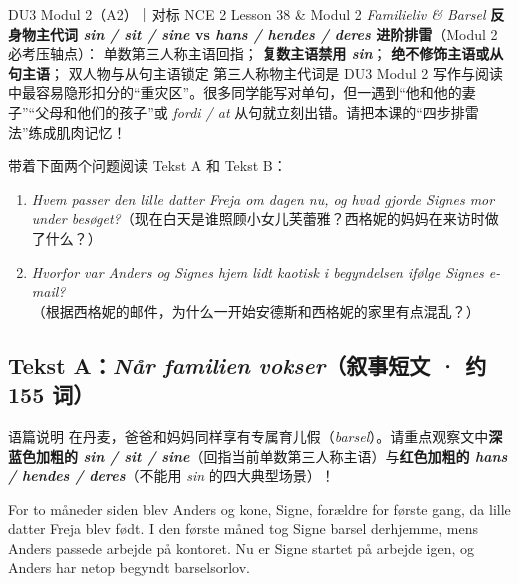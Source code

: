 {DU3 Modul 2（A2）｜对标 NCE 2 Lesson 38 \& Modul 2 \textit{Familieliv \& Barsel}}
{\textbf{反身物主代词 \textit{sin / sit / sine} vs \textit{hans / hendes / deres} 进阶排雷}（Modul 2 必考压轴点）： 单数第三人称主语回指； \textbf{复数主语禁用 \textit{sin}}； \textbf{绝不修饰主语或从句主语}； 双人物与从句主语锁定}
{第三人称物主代词是 DU3 Modul 2 写作与阅读中最容易隐形扣分的“重灾区”。很多同学能写对单句，但一遇到“他和他的妻子”“父母和他们的孩子”或 \textit{fordi / at} 从句就立刻出错。请把本课的“四步排雷法”练成肌肉记忆！}

\begin{foerduleaeser}
带着下面两个问题阅读 Tekst A 和 Tekst B：
\begin{enumerate}
  \item \textit{Hvem passer den lille datter Freja om dagen nu, og hvad gjorde Signes mor under besøget?}（现在白天是谁照顾小女儿芙蕾雅？西格妮的妈妈在来访时做了什么？）
  \item \textit{Hvorfor var Anders og Signes hjem lidt kaotisk i begyndelsen ifølge Signes e-mail?}（根据西格妮的邮件，为什么一开始安德斯和西格妮的家里有点混乱？）
\end{enumerate}
\end{foerduleaeser}


\subsection*{Tekst A：\textit{Når familien vokser}（叙事短文 · 约 155 词）}

\begin{tipbox}{语篇说明}
在丹麦，爸爸和妈妈同样享有专属育儿假（\textit{barsel}）。请重点观察文中\textbf{\color{NCDNavy}深蓝色加粗的 \textit{sin / sit / sine}}（回指当前单数第三人称主语）与\textbf{\color{NCDRed}红色加粗的 \textit{hans / hendes / deres}}（不能用 \textit{sin} 的四大典型场景）！
\end{tipbox}

For to måneder siden blev Anders og  kone, Signe, forældre for første gang, da  lille datter Freja blev født. I den første måned tog Signe  barsel derhjemme, mens Anders passede  arbejde på kontoret. Nu er Signe startet på arbejde igen, og Anders har netop begyndt  barselsorlov.

